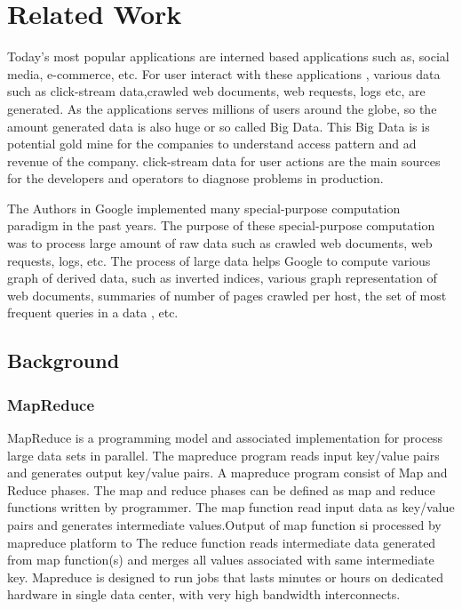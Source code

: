 
\chapter{Related Work} %

\label{Chapter2} %




Today's most popular applications are interned based applications such as, social media, e-commerce, etc. For user interact with these applications , various data such as  click-stream data,crawled web documents, web requests, logs etc, are generated. As the applications serves millions of users around the globe, so the amount generated data is also huge or so called Big Data. This Big Data is is potential gold mine for the companies to understand access pattern and ad revenue of the company.  click-stream data for user actions are the main sources for the developers and operators to diagnose problems in production.

    The Authors in Google implemented many special-purpose computation paradigm in the past years. The purpose of these special-purpose computation was to process large amount of raw data such as crawled web documents, web requests, logs, etc. The process of large data helps Google to compute various graph of derived data, such as inverted indices, various graph representation of web documents, summaries of number of pages crawled per host, the set of most frequent queries in a data , etc.

\section{Background}

\subsection{MapReduce}

MapReduce is a programming model and associated implementation for process large data sets in parallel. The mapreduce program reads input key/value pairs and generates output key/value pairs. A mapreduce program consist of Map and Reduce phases. The map and reduce phases can be defined as map and reduce functions written by programmer. The map function read input data as  key/value pairs and generates intermediate values.Output of map function si processed by mapreduce platform to  The reduce function reads intermediate data generated from map function(s) and merges all values associated with same intermediate key.
Mapreduce is designed to run jobs that lasts minutes or hours on dedicated hardware in single data center, with very high bandwidth interconnects.  

